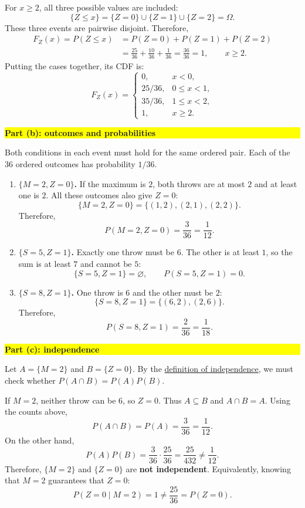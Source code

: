 \documentclass[a4paper,12pt,oneside]{report}
\newcommand{\solutionheading}[1]{%
  \par\Needspace{5\baselineskip}\noindent
  \begingroup\setlength{\fboxsep}{1pt}%
  \colorbox{yellow}{\strut\textbf{#1}}\endgroup\par\nobreak}
\begin{document}
For $x\geq2$, all three possible values are included:
\[
  \{Z\leq x\}=\{Z=0\}\cup\{Z=1\}\cup\{Z=2\}=\Omega.
\]
These three events are pairwise disjoint. Therefore,
\[
  \begin{aligned}
    F_Z(x)=P(Z\leq x)
      &=P(Z=0)+P(Z=1)+P(Z=2)\\
      &=\frac{25}{36}+\frac{10}{36}+\frac{1}{36}
        =\frac{36}{36}=1,\qquad x\geq2.
  \end{aligned}
\]
Putting the cases together, its CDF is:
\[
  F_Z(x)=
  \begin{cases}
    0, & x<0,\\
    25/36, & 0\leq x<1,\\
    35/36, & 1\leq x<2,\\
    1, & x\geq2.
  \end{cases}
\]

\solutionheading{Part (b): outcomes and probabilities}
Both conditions in each event must hold for the same ordered pair.
Each of the $36$ ordered outcomes has probability $1/36$.
\begin{enumerate}
  \item \textbf{$\{M=2,Z=0\}$.}
    If the maximum is $2$, both throws are at most $2$ and at least
    one is $2$. All these outcomes also give $Z=0$:
    \[
      \{M=2,Z=0\}=\{(1,2),(2,1),(2,2)\}.
    \]
    Therefore,
    \[
      P(M=2,Z=0)=\frac3{36}=\frac1{12}.
    \]
  \item \textbf{$\{S=5,Z=1\}$.}
    Exactly one throw must be $6$. The other is at least $1$, so
    the sum is at least $7$ and cannot be $5$:
    \[
      \{S=5,Z=1\}=\varnothing,
      \qquad P(S=5,Z=1)=0.
    \]
  \item \textbf{$\{S=8,Z=1\}$.}
    One throw is $6$ and the other must be $2$:
    \[
      \{S=8,Z=1\}=\{(6,2),(2,6)\}.
    \]
    Therefore,
    \[
      P(S=8,Z=1)=\frac2{36}=\frac1{18}.
    \]
\end{enumerate}

\solutionheading{Part (c): independence}
Let $A=\{M=2\}$ and $B=\{Z=0\}$. By the
\hyperref[def:independent-events]{definition of independence},
we must check whether $P(A\cap B)=P(A)P(B)$.

If $M=2$, neither throw can be $6$, so $Z=0$. Thus $A\subseteq B$
and $A\cap B=A$. Using the counts above,
\[
  P(A\cap B)=P(A)=\frac3{36}=\frac1{12}.
\]
On the other hand,
\[
  P(A)P(B)=\frac3{36}\cdot\frac{25}{36}
  =\frac{25}{432}\neq\frac1{12}.
\]
Therefore, $\{M=2\}$ and $\{Z=0\}$ are \textbf{not independent}.
Equivalently, knowing that $M=2$ guarantees that $Z=0$:
\[
  P(Z=0\mid M=2)=1\neq\frac{25}{36}=P(Z=0).
\]
\end{document}

